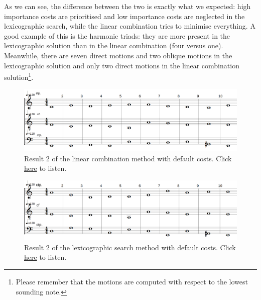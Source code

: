 As we can see, the difference between the two is exactly what we expected: high importance costs are prioritised and low importance costs are neglected in the lexicographic search, while the linear combination tries to minimise everything. A good example of this is the harmonic triads: they are more present in the lexicographic solution than in the linear combination (four versus one). Meanwhile, there are seven direct motions and two oblique motions in the lexicographic solution and only two direct motions in the linear combination solution\footnote{Please remember that the motions are computed with respect to the lowest sounding note.}.

\begin{figure}[h]
    \centering
    \includegraphics[width=1\textwidth]{Images/Experiments/linear-combination-1sp0.png}
    \caption{Result 2 of the linear combination method with default costs. Click \href{https://youtu.be/pnwceQyZd9E}{here} to listen.}
    \label{fig:combili-1sp0}
\end{figure}

\begin{figure}[h]
    \centering
    \includegraphics[width=1\textwidth]{Images/Experiments/basic-lexico-1sp0.png}
    \caption{Result 2 of the lexicographic search method with default costs. Click \href{https://youtu.be/-twWU-hNcYI}{here} to listen.}
    \label{fig:lexico-1sp0}
\end{figure}

